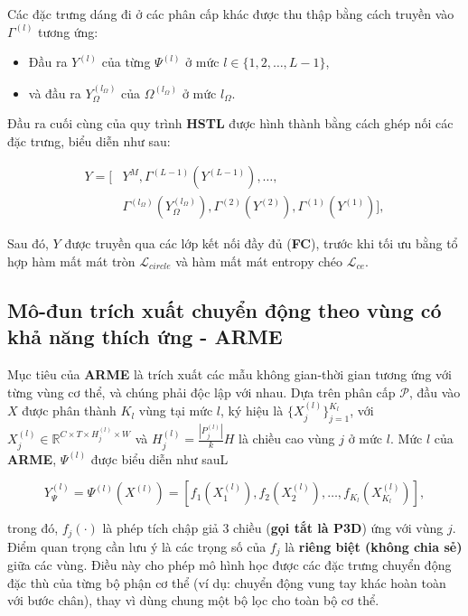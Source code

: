Các đặc trưng dáng đi ở các phân cấp khác được thu thập bằng cách truyền vào $\Gamma^{(l)}$ tương ứng:
\begin{itemize}
  \item Đầu ra $Y^{(l)}$ của từng $\Psi^{(l)}$ ở mức $l \in \{1, 2, \ldots, L-1\}$,
  \item và đầu ra $Y_{\Omega}^{(l_{\Omega})}$ của $\Omega^{(l_{\Omega})}$ ở mức $l_{\Omega}$.
\end{itemize}

Đầu ra cuối cùng của quy trình \textbf{HSTL} được hình thành bằng cách ghép nối các đặc trưng, biểu diễn như sau:

\begin{align}
  Y =  \biggl[ & Y^{M}, \Gamma^{(L-1)}\left(Y^{(L-1)}\right),  \ldots , \nonumber                                                                         \\
               & \Gamma^{(l_{\Omega})}\left(Y_{\Omega}^{(l_{\Omega})}\right), \Gamma^{(2)}\left(Y^{(2)}\right), \Gamma^{(1)}\left(Y^{(1)}\right) \biggl],
\end{align}

Sau đó, $Y$ được truyền qua các lớp kết nối đầy đủ (\textbf{FC}), trước khi tối ưu bằng tổ hợp hàm mất mát tròn $\mathcal{L}_{circle}$ và hàm mất mát entropy chéo $\mathcal{L}_{ce}$.

\subsection{Mô-đun trích xuất chuyển động theo vùng có khả năng thích ứng - \textbf{ARME}}

Mục tiêu của \textbf{ARME} là trích xuất các mẫu không gian-thời gian tương ứng với từng vùng cơ thể, và chúng phải độc lập với nhau. Dựa trên phân cấp $\mathcal{P}$, đầu vào $X$ được phân thành $K_l$ vùng tại mức $l$, ký hiệu là $\{X_{j}^{(l)}\}_{j=1}^{K_l}$, với $X_{j}^{(l)} \in \mathbb{R}^{C \times T \times H_j^{(l)} \times W}$ và $H^{(l)}_j=\frac{\left|P_j^{(l)}\right|}{k}H$ là chiều cao vùng $j$ ở mức $l$. Mức $l$ của \textbf{ARME}, $\Psi^{(l)}$ được biểu diễn như sauL

\begin{equation}
  Y^{(l)}_{\Psi}=\Psi^{(l)}(X^{(l)})=\left[f_{1}(X_{1}^{(l)}), f_{2}(X_{2}^{(l)}) ,\ldots, f_{K_l}(X_{K_l}^{(l)})  \right],
\end{equation}

trong đó, $f_{j}\left(\cdot\right)$ là phép tích chập giả 3 chiều (\textbf{gọi tắt là P3D}) ứng với vùng $j$. Điểm quan trọng cần lưu ý là các trọng số của $f_j$ là \textbf{riêng biệt (không chia sẻ)} giữa các vùng. Điều này cho phép mô hình học được các đặc trưng chuyển động đặc thù của từng bộ phận cơ thể (ví dụ: chuyển động vung tay khác hoàn toàn với bước chân), thay vì dùng chung một bộ lọc cho toàn bộ cơ thể.

